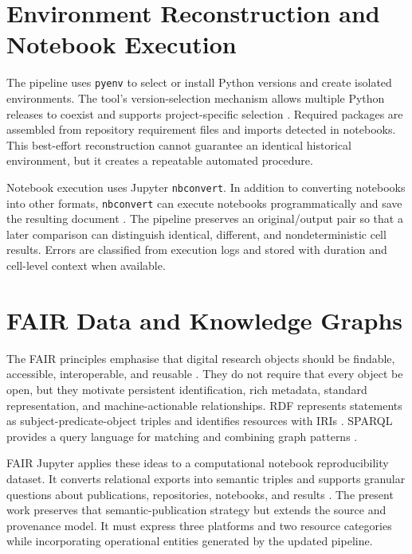 \section{Environment Reconstruction and Notebook Execution}

The pipeline uses \texttt{pyenv} to select or install Python versions and create isolated environments. The tool's version-selection mechanism allows multiple Python releases to coexist and supports project-specific selection \cite{pyenv}. Required packages are assembled from repository requirement files and imports detected in notebooks. This best-effort reconstruction cannot guarantee an identical historical environment, but it creates a repeatable automated procedure.

Notebook execution uses Jupyter \texttt{nbconvert}. In addition to converting notebooks into other formats, \texttt{nbconvert} can execute notebooks programmatically and save the resulting document \cite{nbconvert}. The pipeline preserves an original/output pair so that a later comparison can distinguish identical, different, and nondeterministic cell results. Errors are classified from execution logs and stored with duration and cell-level context when available.

\section{FAIR Data and Knowledge Graphs}

The FAIR principles emphasise that digital research objects should be findable, accessible, interoperable, and reusable \cite{wilkinson2016fair}. They do not require that every object be open, but they motivate persistent identification, rich metadata, standard representation, and machine-actionable relationships. RDF represents statements as subject-predicate-object triples and identifies resources with IRIs \cite{rdf2014}. SPARQL provides a query language for matching and combining graph patterns \cite{sparql2013}.

FAIR Jupyter applies these ideas to a computational notebook reproducibility dataset. It converts relational exports into semantic triples and supports granular questions about publications, repositories, notebooks, and results \cite{samuel2024fairjupyter}. The present work preserves that semantic-publication strategy but extends the source and provenance model. It must express three platforms and two resource categories while incorporating operational entities generated by the updated pipeline.

